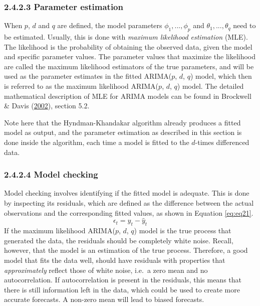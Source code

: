 \documentclass[12pt,oneside]{reedthesis}
\begin{document}
\subsubsection{2.4.2.3 Parameter estimation}\label{parameter-estimation}

When \(p\), \(d\) and \(q\) are defined, the model parameters
\(\phi_{1},...,\phi_{p}\) and \(\theta_{1},...,\theta_{q}\) need to be
estimated. Usually, this is done with \emph{maximum likelihood
estimation} (MLE). The likelihood is the probability of obtaining the
observed data, given the model and specific parameter values. The
parameter values that maximize the likelihood are called the maximum
likelihood estimators of the true parameters, and will be used as the
parameter estimates in the fitted ARIMA(\(p\), \(d\), \(q\)) model,
which then is referred to as the maximum likelihood ARIMA(\(p\), \(d\),
\(q\)) model. The detailed mathematical description of MLE for ARIMA
models can be found in Brockwell \& Davis
(\protect\hyperlink{ref-brockwell2002}{2002}), section 5.2.

Note here that the Hyndman-Khandakar algorithm already produces a fitted
model as output, and the parameter estimation as described in this
section is done inside the algorithm, each time a model is fitted to the
\(d\)-times differenced data.

\subsubsection{2.4.2.4 Model checking}\label{twofourtwofour}

Model checking involves identifying if the fitted model is adequate.
This is done by inspecting its residuals, which are defined as the
difference between the actual observations and the corresponding fitted
values, as shown in Equation \eqref{eq:eq21}.
\begin{equation}
\epsilon_{t} = y_{t} - \hat{y}_{t}
\label{eq:eq21}
\end{equation}
If the maximum likelihood ARIMA(\(p\), \(d\), \(q\)) model is the true
process that generated the data, the residuals should be completely
white noise. Recall, however, that the model is an estimation of the
true process. Therefore, a good model that fits the data well, should
have residuals with properties that \emph{approximately} reflect those
of white noise, i.e.~a zero mean and no autocorrelation. If
autocorrelation is present in the residuals, this means that there is
still information left in the data, which could be used to create more
accurate forecasts. A non-zero mean will lead to biased forecasts.
\end{document}
